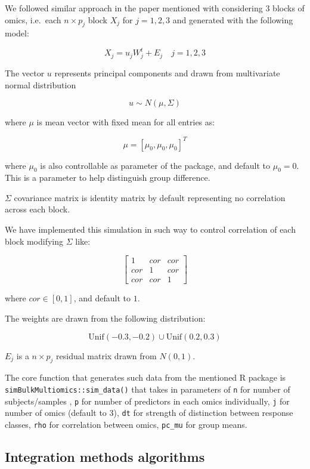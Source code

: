 \documentclass[
]{article}
\begin{document}
We followed similar approach in the paper mentioned with considering 3 blocks of omics, i.e.~each \(n \times p_j\) block \(X_j\) for \(j = 1, 2, 3\) and generated with the following model:

\[X_j = u_j W^{t}_{j} + E_j \quad j = 1, 2, 3\]

The vector \(u\) represents principal components and drawn from multivariate normal distribution

\[u \sim N(\mu, \Sigma)\]

where \(\mu\) is mean vector with fixed mean for all entries as:

\[\mu = [ \mu_0, \mu_0, \mu_0]^T\]

where \(\mu_0\) is also controllable as parameter of the package, and default to \(\mu_0 = 0\). This is a parameter to help distinguish group difference.

\(\Sigma\) covariance matrix is identity matrix by default representing no correlation across each block.

We have implemented this simulation in such way to control correlation of each block modifying \(\Sigma\) like:

\[\begin{bmatrix}1 & cor & cor \\cor & 1 & cor \\cor & cor & 1 \end{bmatrix}\]

where \(cor \in [0, 1]\), and default to \(1\).

The weights are drawn from the following distribution:

\[\text{Unif}(-0.3, -0.2) \cup \text{Unif}(0.2, 0.3)\]

\(E_j\) is a \(n \times p_j\) residual matrix drawn from \(N(0,1)\).

The core function that generates such data from the mentioned R package is \texttt{simBulkMultiomics::sim\_data()} that takes in parameters of \texttt{n} for number of subjects/samples , \texttt{p} for number of predictors in each omics individually, \texttt{j} for number of omics (default to 3), \texttt{dt} for strength of distinction between response classes, \texttt{rho} for correlation between omics, \texttt{pc\_mu} for group means.

\hypertarget{integration-methods-algorithms}{%
\subsection{Integration methods algorithms}\label{integration-methods-algorithms}}
\end{document}
